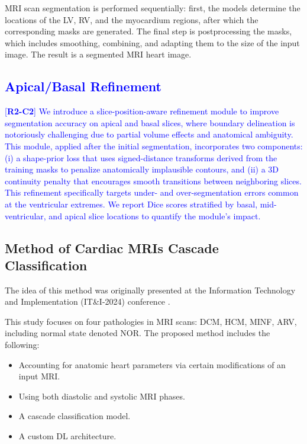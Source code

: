 \documentclass[fleqn,10pt]{wlscirep}
\newcommand{\revtag}[2]{[\textbf{R#1-C#2}]}
\newcommand{\Rtwo}[1]{\textcolor{blue}{#1}}
\begin{document}
MRI scan segmentation is performed sequentially: first, the models determine the locations of the LV, RV, and the myocardium regions, after which the corresponding masks are generated. The final step is postprocessing the masks, which includes smoothing, combining, and adapting them to the size of the input image. The result is a segmented MRI heart image.

\Rtwo{\subsection*{Apical/Basal Refinement}}
\Rtwo{\revtag{2}{2} We introduce a slice-position-aware refinement module to improve segmentation accuracy on apical and basal slices, where boundary delineation is notoriously challenging due to partial volume effects and anatomical ambiguity. This module, applied after the initial segmentation, incorporates two components: (i) a shape-prior loss that uses signed-distance transforms derived from the training masks to penalize anatomically implausible contours, and (ii) a 3D continuity penalty that encourages smooth transitions between neighboring slices. This refinement specifically targets under- and over-segmentation errors common at the ventricular extremes. We report Dice scores stratified by basal, mid-ventricular, and apical slice locations to quantify the module's impact.}

\subsection*{Method of Cardiac MRIs Cascade Classification}

The idea of this method was originally presented at the Information Technology and Implementation (IT\&I-2024) conference \cite{Slobodzian:2025}.

This study focuses on four pathologies in MRI scans: DCM, HCM, MINF, ARV, including normal state denoted NOR. The proposed method includes the following:

\begin{itemize}
    \item Accounting for anatomic heart parameters via certain modifications of an input MRI.
    \item Using both diastolic and systolic MRI phases.
    \item A cascade classification model.
    \item A custom DL architecture.
\end{itemize}
\end{document}
